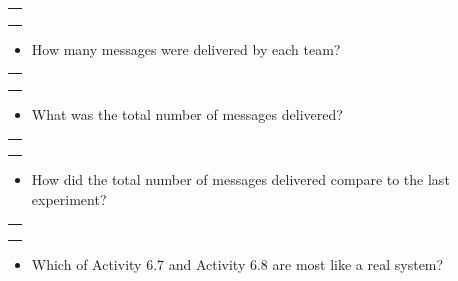 \documentclass[11pt]{article}
\providecommand{\tightlist}{%
      \setlength{\itemsep}{0pt}\setlength{\parskip}{0pt}}
\begin{document}
\begin{longtable}[]{@{}l@{}}
\toprule
 \\
\midrule
\endhead
 \\
 \\
 \\
\bottomrule
\end{longtable}

\begin{itemize}
\tightlist
\item
  How many messages were delivered by each team?
\end{itemize}

\begin{longtable}[]{@{}l@{}}
\toprule
 \\
\midrule
\endhead
 \\
 \\
 \\
\bottomrule
\end{longtable}

\begin{itemize}
\tightlist
\item
  What was the total number of messages delivered?
\end{itemize}

\begin{longtable}[]{@{}l@{}}
\toprule
 \\
\midrule
\endhead
 \\
 \\
 \\
\bottomrule
\end{longtable}

\begin{itemize}
\tightlist
\item
  How did the total number of messages delivered compare to the last
  experiment?
\end{itemize}

\begin{longtable}[]{@{}l@{}}
\toprule
 \\
\midrule
\endhead
 \\
 \\
 \\
\bottomrule
\end{longtable}

\begin{itemize}
\tightlist
\item
  Which of Activity 6.7 and Activity 6.8 are most like a real system?
\end{itemize}
\end{document}
